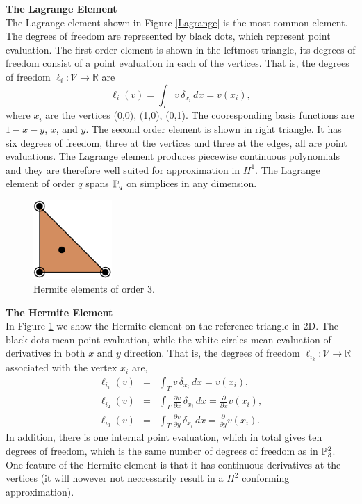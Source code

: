 \begin{example}{\bf{The Lagrange Element}} \\
The Lagrange element shown in Figure \ref{Lagrange} is the most common element.
The degrees of freedom are represented by black dots, which represent point evaluation. 
The first order element is shown in the leftmost triangle, 
its degrees of freedom consist of a point evaluation in each of the vertices. 
That is, the degrees of freedom $\ell_i : \mathcal{V} \rightarrow \mathbb{R}$ are  
\begin{equation}
\ell_i ( v) = \int_{T} v \, \delta_{x_i} \, dx = v(x_i),   
\end{equation}
where $x_i$ are the vertices (0,0), (1,0), (0,1).
The cooresponding basis functions
are $1-x-y$, $x$, and $y$.  The second order element is shown in right 
triangle. It has six degrees of freedom, three at the vertices and three
at the edges, all are point evaluations.  
The Lagrange element produces piecewise continuous polynomials and they are therefore
well suited for approximation in $H^1$.
The Lagrange element of order $q$ spans $\P_q$ on simplices in any dimension.  
\end{example}

\begin{figure}
  \begin{center}
    \includegraphics[height=3cm]{chapters/kirby-6/pdf/HER3.pdf}
    \caption{Hermite elements of order 3.}
    \label{Hermite}
  \end{center}
\end{figure}

\begin{example}{\bf{ The Hermite Element}} \\
In Figure \ref{Hermite} we show the Hermite element on the reference triangle in 2D. The black dots mean point
evaluation, while the white circles mean evaluation of derivatives in both $x$ and
$y$ direction. 
That is, the degrees of freedom $\ell_{i_k} : \mathcal{V} \rightarrow \mathbb{R}$ 
associated with the vertex $x_i$ are,  
\begin{eqnarray}
\ell_{i_1} ( v) &=& \int_{T} {v} \, \delta_{x_i} \, dx = v(x_i),    \\
\ell_{i_2} ( v) &=& \int_{T} \frac{\partial{v}}{\partial x} \, \delta_{x_i} \, dx = \frac{\partial}{\partial x} v(x_i),  \\  
\ell_{i_3} ( v) &=& \int_{T} \frac{\partial{v}}{\partial y} \, \delta_{x_i} \, dx = \frac{\partial}{\partial y} v(x_i) .    
\end{eqnarray}
In addition, there is one internal point evaluation, which in total gives ten degrees of freedom, which is the same number
of degrees of freedom as in $\P^2_3$.  One feature of the Hermite element
is that it has continuous derivatives at the vertices (it will however
not neccessarily result in a $H^2$ conforming approximation).
\end{example}

